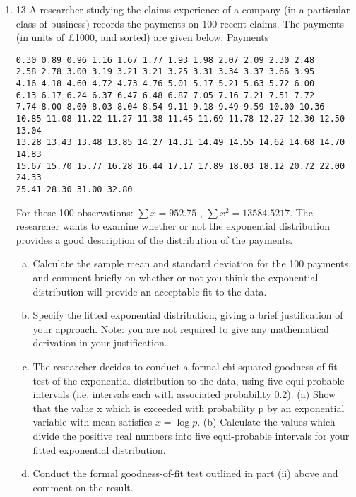 \documentclass[a4paper,12pt]{article}
\begin{document}
\begin{enumerate}
\item
13 A researcher studying the claims experience of a company (in a particular class of business) records the payments on 100 recent claims. The payments (in units of £1000, and sorted) are given below.
Payments
\begin{verbatim}
0.30 0.89 0.96 1.16 1.67 1.77 1.93 1.98 2.07 2.09 2.30 2.48
2.58 2.78 3.00 3.19 3.21 3.21 3.25 3.31 3.34 3.37 3.66 3.95
4.16 4.18 4.60 4.72 4.73 4.76 5.01 5.17 5.21 5.63 5.72 6.00
6.13 6.17 6.24 6.37 6.47 6.48 6.87 7.05 7.16 7.21 7.51 7.72
7.74 8.00 8.00 8.03 8.04 8.54 9.11 9.18 9.49 9.59 10.00 10.36
10.85 11.08 11.22 11.27 11.38 11.45 11.69 11.78 12.27 12.30 12.50 13.04
13.28 13.43 13.48 13.85 14.27 14.31 14.49 14.55 14.62 14.68 14.70 14.83
15.67 15.70 15.77 16.28 16.44 17.17 17.89 18.03 18.12 20.72 22.00 24.33
25.41 28.30 31.00 32.80
\end{verbatim}

For these 100 observations: $\sum x = 952.75$ , $\sum x^2 = 13584.5217$.
The researcher wants to examine whether or not the exponential distribution provides
a good description of the distribution of the payments.
\begin{enumerate}[(a)]
\item Calculate the sample mean and standard deviation for the 100 payments, and comment briefly on whether or not you think the exponential distribution will provide an acceptable fit to the data.
\item Specify the fitted exponential distribution, giving a brief justification of your approach.
Note: you are not required to give any mathematical derivation in your justification.
\item The researcher decides to conduct a formal chi-squared goodness-of-fit test of the exponential distribution to the data, using five equi-probable intervals (i.e. intervals each with associated probability 0.2).
(a) Show that the value x which is exceeded with probability p by an exponential variable with mean satisfies $x = \log p$.
(b) Calculate the values which divide the positive real numbers into five equi-probable intervals for your fitted exponential distribution.
\item  Conduct the formal goodness-of-fit test outlined in part (ii) above and
comment on the result. 
\end{enumerate}


\end{enumerate}
\end{document}
